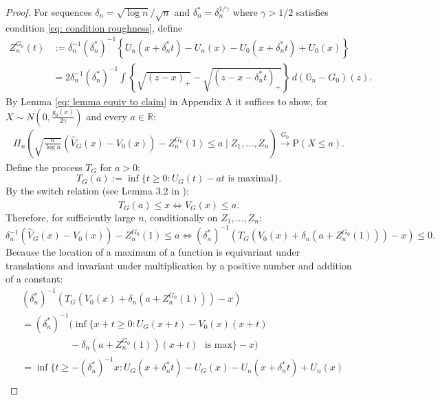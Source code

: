 \begin{proof}
For sequences $\delta_n = \sqrt{\log{n}}/\sqrt{n}$ and $\delta_n^{*}=\delta_n^{1 / \gamma}$ where $\gamma >1 / 2$ satisfies condition \eqref{eq: condition roughness}, define
\begin{align}\label{eq: Z_n process}
	Z^{\scriptscriptstyle{G_0}}_n(t) & :=\delta_n^{-1}\left(\delta_n^*\right)^{-1}\left\{U_n\left(x+\delta_n^* t\right)-U_n(x)-U_0\left(x+\delta_n^* t\right)+U_0(x)\right\} \\
	& =2 \delta_n^{-1} (\delta^*_n)^{-1} \int\left\{\sqrt{(z-x)_+} -\sqrt{(z-x-\delta^*_n t)_+} \right\} \, d\left(\mathbb{G}_n-G_0\right)(z).
\end{align}
By Lemma \ref{eq: lemma equiv to claim} in Appendix A it suffices to show, for $X \sim N\left(0, \frac{g_0(x)}{2 \gamma}\right)$ and every $a \in \mathbb{R}$:
\begin{align}\label{eq: equiv to claim}
	\Pi_n\left( \sqrt{\frac{n}{\log n}}\left(\hat{V}_{\scriptscriptstyle{G}}(x)-V_0(x)\right) -Z^{\scriptscriptstyle{G_0}}_n(1) \leq a \mid Z_1, \ldots, Z_n \right) \xrightarrow{G_0} \mathrm{P}(X \leq a).
\end{align}
Define the process \( T_{\scriptscriptstyle{G}} \) for \( a > 0 \):
\[
T_{\scriptscriptstyle{G}}(a) := \inf \{ t \geq 0 : U_{\scriptscriptstyle{G}}(t) - at \text{ is maximal} \}.
\]
By the switch relation (see Lemma 3.2 in \cite{2}):
\[
T_{\scriptscriptstyle{G}}(a) \leq x \iff \hat{V}_{\scriptscriptstyle{G}}(x) \leq a.
\]
Therefore, for sufficiently large \( n \), conditionally on $Z_1, \ldots, Z_n$:
\[
\delta_n^{-1} ( \hat{V}_{\scriptscriptstyle{G}}(x) - V_0(x) ) - Z^{\scriptscriptstyle{G_0}}_n(1) \leq a 
\iff \left( \delta_n^* \right)^{-1} \left( T_{\scriptscriptstyle{G}} \left( V_0(x) + \delta_n (a + Z^{\scriptscriptstyle{G_0}}_n(1)) \right) - x \right) \leq 0.
\]
Because the location of a maximum of a function is equivariant under translations and invariant under multiplication by a positive number and addition of a constant:
\begin{align*}
	&\left( \delta_n^* \right)^{-1} \left( T_{\scriptscriptstyle{G}} \left( V_0(x) + \delta_n (a + Z^{\scriptscriptstyle{G_0}}_n(1)) \right) - x \right)\\
	& = \left( \delta_n^* \right)^{-1} \big( \inf \big\{ x + t \geq 0 : U_{\scriptscriptstyle{G}}(x + t) - V_0(x)(x+t) \\
    &\quad \quad \quad \quad \quad - \delta_n (a + Z^{\scriptscriptstyle{G_0}}_n(1))(x + t) \, \, \text{ is max} \big\} - x \big)\\
	&= \inf \big\{t \geq-(\delta^*_n)^{-1} x: U_{\scriptscriptstyle{G}}\left(x+\delta^*_n t\right)-U_{\scriptscriptstyle{G}}(x) -U_n\left(x+\delta^*_n t\right)+U_n(x)\\

\end{align*}
\end{proof}
